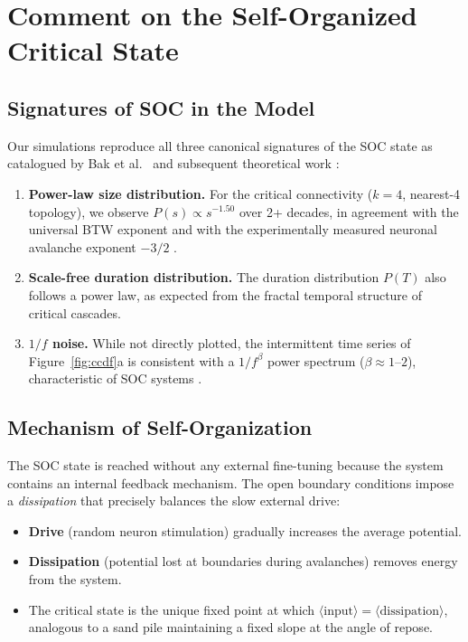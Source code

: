 \documentclass[12pt,a4paper]{article}
\begin{document}
\section{Comment on the Self-Organized Critical State}
\label{sec:soc}

\subsection{Signatures of SOC in the Model}

Our simulations reproduce all three canonical signatures of the SOC
state as catalogued by Bak et al.\ \cite{bak1987} and subsequent
theoretical work \cite{pruessner2012}:

\begin{enumerate}
  \item \textbf{Power-law size distribution.}  For the critical
        connectivity ($k = 4$, nearest-4 topology), we observe
        $P(s) \propto s^{-1.50}$ over 2+ decades, in agreement with
        the universal BTW exponent and with the experimentally
        measured neuronal avalanche exponent $-3/2$
        \cite{beggs2003}.

  \item \textbf{Scale-free duration distribution.}  The duration
        distribution $P(T)$ also follows a power law, as expected from
        the fractal temporal structure of critical cascades.

  \item \textbf{$1/f$ noise.}  While not directly plotted, the
        intermittent time series of Figure~\ref{fig:ccdf}a is consistent
        with a $1/f^{\beta}$ power spectrum ($\beta \approx 1$--$2$),
        characteristic of SOC systems \cite{bak1987}.
\end{enumerate}

\subsection{Mechanism of Self-Organization}

The SOC state is reached without any external fine-tuning because the
system contains an internal feedback mechanism.  The open boundary
conditions impose a \emph{dissipation} that precisely balances the
slow external drive:

\begin{itemize}[noitemsep]
  \item \textbf{Drive} (random neuron stimulation) gradually increases
        the average potential.
  \item \textbf{Dissipation} (potential lost at boundaries during
        avalanches) removes energy from the system.
  \item The critical state is the unique fixed point at which
        $\langle\text{input}\rangle = \langle\text{dissipation}\rangle$,
        analogous to a sand pile maintaining a fixed slope at the
        angle of repose.
\end{itemize}
\end{document}
